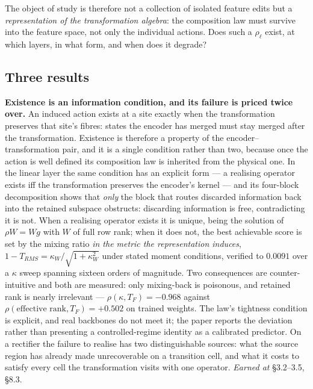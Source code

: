 The object of study is therefore not a collection of isolated feature edits but a \textit{representation of the transformation algebra}: the composition law must survive into the feature space, not only the individual actions. Does such a $\rho_\ell$ exist, at which layers, in what form, and when does it degrade?

\subsection{Three results}

\textbf{Existence is an information condition, and its failure is priced twice over.} An induced action exists at a site exactly when the transformation preserves that site's fibres: states the encoder has merged must stay merged after the transformation. Existence is therefore a property of the encoder--transformation pair, and it is a single condition rather than two, because once the action is well defined its composition law is inherited from the physical one. In the linear layer the same condition has an explicit form --- a realising operator exists iff the transformation preserves the encoder's kernel --- and its four-block decomposition shows that \textit{only} the block that routes discarded information back into the retained subspace obstructs: discarding information is free, contradicting it is not. When a realising operator exists it is unique, being the solution of $\rho W=Wg$ with $W$ of full row rank; when it does not, the best achievable score is set by the mixing ratio \textit{in the metric the representation induces}, $1-T_{RMS}=\kappa_W/\sqrt{1+\kappa_W^2}$ under stated moment conditions, verified to $0.0091$ over a $\kappa$ sweep spanning sixteen orders of magnitude. Two consequences are counter-intuitive and both are measured: only mixing-back is poisonous, and retained rank is nearly irrelevant --- $\rho(\kappa,T_F)=-0.968$ against $\rho(\text{effective rank},T_F)=+0.502$ on trained weights. The law's tightness condition is explicit, and real backbones do not meet it; the paper reports the deviation rather than presenting a controlled-regime identity as a calibrated predictor. On a rectifier the failure to realise has two distinguishable sources: what the source region has already made unrecoverable on a transition cell, and what it costs to satisfy every cell the transformation visits with one operator. \textit{Earned at} \S{}3.2--3.5, \S{}8.3.

